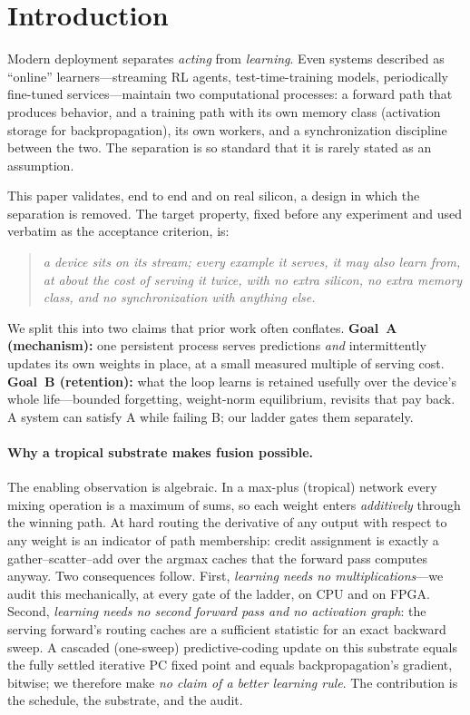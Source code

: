 \documentclass{article}
\begin{document}
\section{Introduction}
\label{sec:intro}

Modern deployment separates \emph{acting} from \emph{learning}. Even systems
described as ``online'' learners---streaming RL agents, test-time-training
models, periodically fine-tuned services---maintain two computational
processes: a forward path that produces behavior, and a training path with its
own memory class (activation storage for backpropagation), its own workers,
and a synchronization discipline between the two. The separation is so
standard that it is rarely stated as an assumption.

This paper validates, end to end and on real silicon, a design in which the
separation is removed. The target property, fixed before any experiment and
used verbatim as the acceptance criterion, is:
\begin{quote}\itshape
a device sits on its stream; every example it serves, it may also learn from,
at about the cost of serving it twice, with no extra silicon, no extra memory
class, and no synchronization with anything else.
\end{quote}
We split this into two claims that prior work often conflates.
\textbf{Goal~A (mechanism):} one persistent process serves predictions
\emph{and} intermittently updates its own weights in place, at a small
measured multiple of serving cost. \textbf{Goal~B (retention):} what the
loop learns is retained usefully over the device's whole life---bounded
forgetting, weight-norm equilibrium, revisits that pay back. A system can
satisfy A while failing B; our ladder gates them separately.

\paragraph{Why a tropical substrate makes fusion possible.}
The enabling observation is algebraic. In a max-plus (tropical) network every
mixing operation is a maximum of sums, so each weight enters
\emph{additively} through the winning path. At hard routing the derivative of
any output with respect to any weight is an indicator of path membership:
credit assignment is exactly a gather--scatter--add over the argmax caches
that the forward pass computes anyway. Two consequences follow. First,
\emph{learning needs no multiplications}---we audit this mechanically, at
every gate of the ladder, on CPU and on FPGA. Second, \emph{learning needs no
second forward pass and no activation graph}: the serving forward's routing
caches are a sufficient statistic for an exact backward sweep. A cascaded
(one-sweep) predictive-coding update on this substrate equals the fully
settled iterative PC fixed point and equals backpropagation's gradient,
bitwise; we therefore make \emph{no claim of a better learning rule}. The
contribution is the schedule, the substrate, and the audit.
\end{document}
